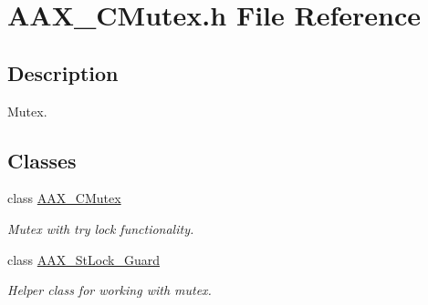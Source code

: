 \hypertarget{a00179}{}\section{A\+A\+X\+\_\+\+C\+Mutex.\+h File Reference}
\label{a00179}


\subsection{Description}
Mutex. 

\subsection*{Classes}
\begin{DoxyCompactItemize}
\item 
class \hyperlink{a00027}{A\+A\+X\+\_\+\+C\+Mutex}
\begin{DoxyCompactList}\small\item\em Mutex with try lock functionality. \end{DoxyCompactList}\item 
class \hyperlink{a00128}{A\+A\+X\+\_\+\+St\+Lock\+\_\+\+Guard}
\begin{DoxyCompactList}\small\item\em Helper class for working with mutex. \end{DoxyCompactList}\end{DoxyCompactItemize}
